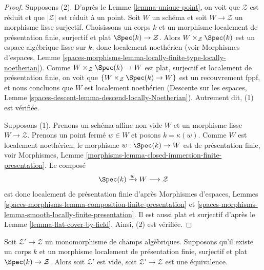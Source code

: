 \begin{proof}
Supposons (2). D'après le
Lemme \ref{lemma-unique-point},
on voit que $\mathcal{Z}$ est réduit et que $|\mathcal{Z}|$ est réduit à un point.
Soit $W$ un schéma et soit $W \to \mathcal{Z}$ un morphisme lisse
surjectif. Choisissons un corps $k$ et un morphisme localement de présentation finie,
surjectif et plat $\Spec(k) \to \mathcal{Z}$.
Alors $W \times_\mathcal{Z} \Spec(k)$ est un espace algébrique
lisse sur $k$, donc localement noethérien (voir
Morphismes d'espaces, Lemme
\ref{spaces-morphisms-lemma-locally-finite-type-locally-noetherian}).
Comme $W \times_\mathcal{Z} \Spec(k) \to W$
est plat, surjectif et localement de présentation finie, on voit
que $\{W \times_\mathcal{Z} \Spec(k) \to W\}$ est un recouvrement fppf,
et nous concluons que $W$ est localement noethérien
(Descente sur les espaces, Lemme
\ref{spaces-descent-lemma-descend-locally-Noetherian}).
Autrement dit, (1) est vérifiée.

\medskip\noindent
Supposons (1). Prenons un schéma affine non vide $W$ et un morphisme lisse
$W \to \mathcal{Z}$. Prenons un point fermé $w \in W$ et posons
$k = \kappa(w)$. Comme $W$ est localement noethérien, le morphisme
$w : \Spec(k) \to W$ est de présentation finie, voir
Morphismes, Lemme \ref{morphisms-lemma-closed-immersion-finite-presentation}.
Le composé
$$
\Spec(k) \xrightarrow{w} W \longrightarrow \mathcal{Z}
$$
est donc localement de présentation finie d'après
Morphismes d'espaces, Lemmes
\ref{spaces-morphisms-lemma-composition-finite-presentation} et
\ref{spaces-morphisms-lemma-smooth-locally-finite-presentation}.
Il est aussi plat et surjectif d'après le
Lemme \ref{lemma-flat-cover-by-field}.
Ainsi, (2) est vérifiée.
\end{proof}

\begin{lemma}
\label{lemma-monomorphism-into-point}
Soit $\mathcal{Z}' \to \mathcal{Z}$ un monomorphisme de champs algébriques.
Supposons qu'il existe un corps $k$ et un morphisme localement de présentation finie,
surjectif et plat $\Spec(k) \to \mathcal{Z}$. Alors soit $\mathcal{Z}'$
est vide, soit $\mathcal{Z}' \to \mathcal{Z}$ est une équivalence.
\end{lemma}

